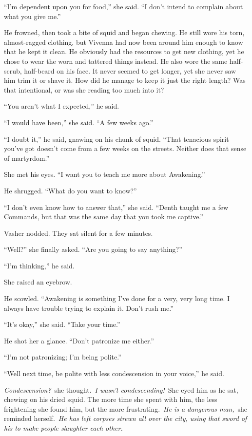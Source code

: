 “I’m dependent upon you for food,” she said. “I don’t intend to complain about what you give me.”

He frowned, then took a bite of squid and began chewing. He still wore his torn, almost-ragged clothing, but Vivenna had now been around him enough to know that he kept it clean. He obviously had the resources to get new clothing, yet he chose to wear the worn and tattered things instead. He also wore the same half-scrub, half-beard on his face. It never seemed to get longer, yet she never saw him trim it or shave it. How did he manage to keep it just the right length? Was that intentional, or was she reading too much into it?

“You aren’t what I expected,” he said.

“I would have been,” she said. “A few weeks ago.”

“I doubt it,” he said, gnawing on his chunk of squid. “That tenacious spirit you’ve got doesn’t come from a few weeks on the streets. Neither does that sense of martyrdom.”

She met his eyes. “I want you to teach me more about Awakening.”

He shrugged. “What do you want to know?”

“I don’t even know how to answer that,” she said. “Denth taught me a few Commands, but that was the same day that you took me captive.”

Vasher nodded. They sat silent for a few minutes.

“Well?” she finally asked. “Are you going to say anything?”

“I’m thinking,” he said.

She raised an eyebrow.

He scowled. “Awakening is something I’ve done for a very, very long time. I always have trouble trying to explain it. Don’t rush me.”

“It’s okay,” she said. “Take your time.”

He shot her a glance. “Don’t patronize me either.”

“I’m not patronizing; I’m being polite.”

“Well next time, be polite with less condescension in your voice,” he said.

\textit{Condescension?}~she thought.~\textit{I wasn’t condescending!}~She eyed him as he sat, chewing on his dried squid. The more time she spent with him, the less frightening she found him, but the more frustrating.~\textit{He is a dangerous man,}~she reminded herself.~\textit{He has left corpses strewn all over the city, using that sword of his to make people slaughter each other.}

